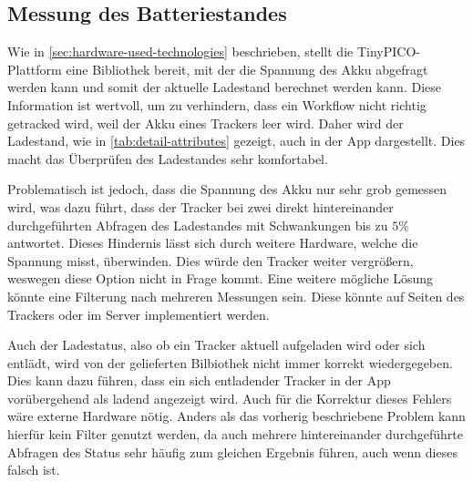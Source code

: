 \subsection{Messung des Batteriestandes}

Wie in \autoref{sec:hardware-used-technologies} beschrieben, stellt die TinyPICO-Plattform eine
Bibliothek bereit, mit der die Spannung des \gls{Akku} abgefragt werden kann und somit der aktuelle
Ladestand berechnet werden kann. Diese Information ist wertvoll, um zu verhindern, dass ein Workflow
nicht richtig getracked wird, weil der \gls{Akku} eines Trackers leer wird. Daher wird der
Ladestand, wie in \autoref{tab:detail-attributes} gezeigt, auch in der App dargestellt. Dies macht das
Überprüfen des Ladestandes sehr komfortabel.

Problematisch ist jedoch, dass die Spannung des \gls{Akku} nur sehr grob gemessen wird, was dazu
führt, dass der Tracker bei zwei direkt hintereinander durchgeführten Abfragen des Ladestandes mit
Schwankungen bis zu $5\%$ antwortet. Dieses Hindernis lässt sich durch weitere Hardware, welche
die Spannung misst, überwinden. Dies würde den Tracker weiter vergrößern, weswegen diese Option
nicht in Frage kommt. Eine weitere mögliche Lösung könnte eine Filterung nach mehreren Messungen
sein. Diese könnte auf Seiten des Trackers oder im Server implementiert werden.

Auch der Ladestatus, also ob ein Tracker aktuell aufgeladen wird oder sich entlädt, wird von der
gelieferten Bilbiothek nicht immer korrekt wiedergegeben. Dies kann dazu führen, dass ein sich
entladender Tracker in der App vorübergehend als ladend angezeigt wird. Auch für die Korrektur dieses
Fehlers wäre externe Hardware nötig. Anders als das vorherig beschriebene Problem kann hierfür kein
Filter genutzt werden, da auch mehrere hintereinander durchgeführte Abfragen des Status sehr häufig zum
gleichen Ergebnis führen, auch wenn dieses falsch ist.

